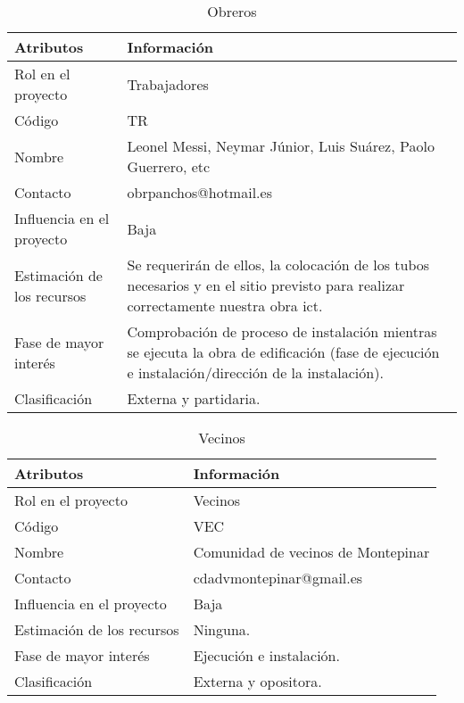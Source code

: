 \begin{table}[H]
\centering
\begin{tabular}{|m{5cm}|m{11cm}| }
\hline
\rowcolor{gray!50} \centering Atributos & Información  \\
\hline
\hline
 Rol en el proyecto & Trabajadores \\
 \hline
 Código & TR \\
 \hline
 Nombre & Leonel Messi, Neymar Júnior, Luis Suárez, Paolo Guerrero, etc \\
\hline
 Contacto & obrpanchos@hotmail.es \\
\hline
 Influencia en el proyecto & Baja \\
\hline
 Estimación de los recursos & Se requerirán de ellos, la colocación de los tubos necesarios y en el sitio previsto para realizar correctamente nuestra obra ict. \\
\hline
 Fase de mayor interés & Comprobación de proceso de instalación mientras se ejecuta la obra de edificación (fase de ejecución e instalación/dirección de la instalación).\\
\hline
Clasificación & Externa y partidaria.\\
 \hline
\end{tabular}
\caption{Obreros}
\label{table:ta1}
\end{table}
\begin{table}[H]
\centering
\begin{tabular}{|m{5cm}|m{11cm}| }
\hline
\rowcolor{gray!50} \centering Atributos & Información  \\
\hline
\hline
 Rol en el proyecto & Vecinos \\
 \hline
 Código & VEC \\
 \hline
 Nombre & Comunidad de vecinos de Montepinar \\
\hline
 Contacto & cdadvmontepinar@gmail.es \\
\hline
 Influencia en el proyecto & Baja \\
\hline
 Estimación de los recursos & Ninguna. \\
\hline
 Fase de mayor interés & Ejecución e instalación.\\
\hline
Clasificación & Externa y opositora.\\
 \hline
\end{tabular}
\caption{Vecinos}
\label{table:ta1}
\end{table}
